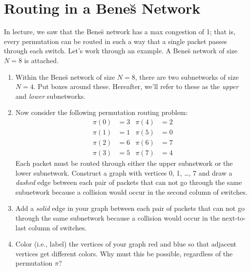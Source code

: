 \documentclass[12pt]{article}
\newcommand{\mfigure}[3]{\bigskip\centerline{\resizebox{#1}{#2}{\texttt{[image: \#3]}}}\bigskip}
\begin{document}

\section*{Routing in a Bene\u{s} Network}

In lecture, we saw that the Bene\u{s} network has a max congestion of
1; that is, every permutation can be routed in such a way that a
single packet passes through each switch.  Let's work through an
example.  A Bene\u{s} network of size $N = 8$ is attached.

\begin{enumerate}
\item Within the Bene\u{s} network of size $N = 8$, there are two
subnetworks of size $N = 4$.  Put boxes around these.  Hereafter,
we'll refer to these as the \textit{upper} and \textit{lower}
subnetworks.

\solution{
\ \\
\mfigure{!}{2in}{benes-decomp}
}

\item Now consider the following permutation routing problem:
%
\begin{align*}
\pi(0) & = 3 & \pi(4) & = 2 \\
\pi(1) & = 1 & \pi(5) & = 0 \\
\pi(2) & = 6 & \pi(6) & = 7 \\
\pi(3) & = 5 & \pi(7) & = 4
\end{align*}
%
Each packet must be routed through either the upper subnetwork or the
lower subnetwork.  Construct a graph with vertices 0, 1, \ldots, 7 and
draw a \textit{dashed} edge between each pair of packets that can not
go through the same subnetwork because a collision would occur in the
second column of switches.

\solution{
\ \\
\mfigure{!}{2in}{rec-const1}
}

\item Add a \textit{solid} edge in your graph between each pair of
packets that can not go through the same subnetwork because a
collision would occur in the next-to-last column of switches.

\solution{
\ \\
\mfigure{!}{2in}{rec-const2}
}

\item Color (i.e., label) the vertices of your graph red and blue so
  that adjacent vertices get different colors.  Why must this be
  possible, regardless of the permutation $\pi$?


\end{enumerate}
\end{document}
